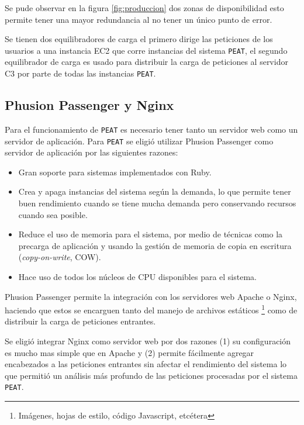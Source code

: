 Se pude observar en la figura \ref{fig:produccion} dos zonas de disponibilidad
esto permite tener una mayor redundancia al no tener un único punto de error.

Se tienen dos equilibradores de carga el primero dirige las peticiones de los
usuarios a una instancia EC2 que corre instancias del sistema \texttt{PEAT},
el segundo equilibrador de carga es usado para distribuir la carga de peticiones
al servidor C3 por parte de todas las instancias \texttt{PEAT}.

\subsection{Phusion Passenger y Nginx}

Para el funcionamiento de \texttt{PEAT} es necesario tener tanto un servidor web
como un servidor de aplicación.
Para \texttt{PEAT} se eligió utilizar Phusion Passenger como servidor de aplicación
por las siguientes razones:

\begin{itemize}
\item Gran soporte para sistemas implementados con Ruby.
\item Crea y apaga instancias del sistema según la demanda, lo que permite tener
  buen rendimiento cuando se tiene mucha demanda pero conservando recursos cuando
  sea posible.
\item Reduce el uso de memoria para el sistema, por medio de técnicas como
  la precarga de aplicación y usando la gestión de memoria de copia en escritura
  (\textit{copy-on-write}, COW).
\item Hace uso de todos los núcleos de CPU disponibles para el sistema.
\end{itemize}

Phusion Passenger permite la integración con los servidores web Apache o Nginx,
haciendo que estos se encarguen tanto del manejo de archivos estáticos
\footnote{Imágenes, hojas de estilo, código Javascript, etcétera} como de distribuir
la carga de peticiones entrantes.

Se eligió integrar Nginx como servidor web por dos razones (1) su configuración es
mucho mas simple que en Apache y (2) permite fácilmente agregar encabezados a las
peticiones entrantes sin afectar el rendimiento del sistema lo que permitió un
análisis más profundo de las peticiones procesadas por el sistema \texttt{PEAT}.

